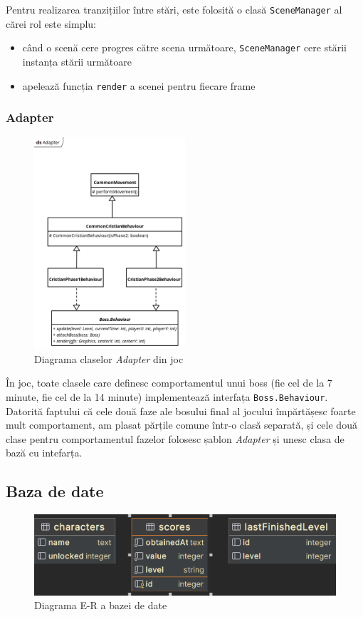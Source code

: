 \documentclass{article}
\begin{document}
    Pentru realizarea tranzițiilor între stări, este folosită o clasă \texttt{SceneManager} al cărei
    rol este simplu:
    \begin{itemize}
        \item când o scenă cere progres către scena următoare, \texttt{SceneManager} cere stării
        instanța stării următoare
        \item apelează funcția \texttt{render} a scenei pentru fiecare frame
    \end{itemize}

    \subsubsection{Adapter}

    \begin{figure}[H]
        \includegraphics[width=0.5\textwidth]{adapter-diagram}
        \centering
        \caption{Diagrama claselor \emph{Adapter} din joc}
    \end{figure}

    În joc, toate clasele care definesc comportamentul unui boss (fie cel de la 7 minute, fie cel
    de la 14 minute) implementează interfața \texttt{Boss.Behaviour}. Datorită faptului că cele două
    faze ale bosului final al jocului împărtășesc foarte mult comportament, am plasat părțile comune
    într-o clasă separată, și cele două clase pentru comportamentul fazelor folosesc șablon
    \emph{Adapter} și unesc clasa de bază cu intefarța.

    \subsection{Baza de date}
    \begin{figure}[H]
        \includegraphics[width=\textwidth]{er-diagram}
        \centering
        \caption{Diagrama E-R a bazei de date}
    \end{figure}
\end{document}
